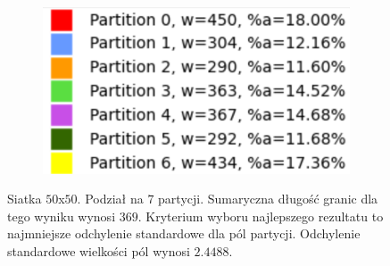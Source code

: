 \begin{figure}[h]
\centering
\begin{subfigure}{.33\textwidth}
    \centering
    \caption[short]{}
\end{subfigure}%
\begin{subfigure}{.33\textwidth}
    \centering
    \caption[short]{}
\end{subfigure}%
\begin{subfigure}{.33\textwidth}
    \centering
    \includegraphics[width=0.9\linewidth]{images/results/m_k/with/7/results}
    \caption[short]{}
\end{subfigure}
\caption{Siatka $50$x$50$. Podział na $7$ partycji. Sumaryczna długość granic dla tego wyniku wynosi $369$.
Kryterium wyboru najlepszego rezultatu to najmniejsze odchylenie standardowe dla pól partycji.
Odchylenie standardowe wielkości pól wynosi $2.4488$.}
\label{result:7}
\end{figure}
